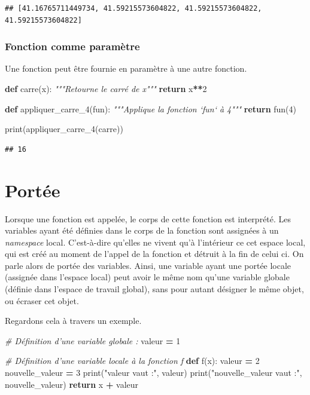 \documentclass[12pt,]{book}
\newenvironment{Shaded}{\begin{snugshade}}{\end{snugshade}}
\newcommand{\KeywordTok}[1]{\textcolor[rgb]{0.13,0.29,0.53}{\textbf{#1}}}
\newcommand{\DecValTok}[1]{\textcolor[rgb]{0.00,0.00,0.81}{#1}}
\newcommand{\StringTok}[1]{\textcolor[rgb]{0.31,0.60,0.02}{#1}}
\newcommand{\CommentTok}[1]{\textcolor[rgb]{0.56,0.35,0.01}{\textit{#1}}}
\newcommand{\ControlFlowTok}[1]{\textcolor[rgb]{0.13,0.29,0.53}{\textbf{#1}}}
\newcommand{\OperatorTok}[1]{\textcolor[rgb]{0.81,0.36,0.00}{\textbf{#1}}}
\newcommand{\BuiltInTok}[1]{#1}
\newcommand{\NormalTok}[1]{#1}
\numberwithin{equation}{section}
\numberwithin{countremarque}{section}
\begin{document}
\begin{lstlisting}
## [41.16765711449734, 41.59215573604822, 41.59215573604822, 41.59215573604822]
\end{lstlisting}

\subsubsection{Fonction comme paramètre}\label{fonction-comme-parametre}

Une fonction peut être fournie en paramètre à une autre fonction.

\begin{Shaded}
\begin{Highlighting}[]
\KeywordTok{def}\NormalTok{ carre(x):}
  \CommentTok{"""Retourne le carré de x"""}
  \ControlFlowTok{return}\NormalTok{ x}\OperatorTok{**}\DecValTok{2}
  
\KeywordTok{def}\NormalTok{ appliquer_carre_4(fun):}
  \CommentTok{"""Applique la fonction `fun` à 4"""}
  \ControlFlowTok{return}\NormalTok{ fun(}\DecValTok{4}\NormalTok{)}

\BuiltInTok{print}\NormalTok{(appliquer_carre_4(carre))}
\end{Highlighting}
\end{Shaded}

\begin{lstlisting}
## 16
\end{lstlisting}

\section{Portée}\label{portee}

Lorsque une fonction est appelée, le corps de cette fonction est
interprété. Les variables ayant été définies dans le corps de la
fonction sont assignées à un \emph{namespace} local. C'est-à-dire
qu'elles ne vivent qu'à l'intérieur ce cet espace local, qui est créé au
moment de l'appel de la fonction et détruit à la fin de celui ci. On
parle alors de portée des variables. Ainsi, une variable ayant une
portée locale (assignée dans l'espace local) peut avoir le même nom
qu'une variable globale (définie dans l'espace de travail global), sans
pour autant désigner le même objet, ou écraser cet objet.

Regardons cela à travers un exemple.

\begin{Shaded}
\begin{Highlighting}[]
\CommentTok{# Définition d'une variable globale :}
\NormalTok{valeur }\OperatorTok{=} \DecValTok{1}

\CommentTok{# Définition d'une variable locale à la fonction f}
\KeywordTok{def}\NormalTok{ f(x):}
\NormalTok{  valeur }\OperatorTok{=} \DecValTok{2}
\NormalTok{  nouvelle_valeur }\OperatorTok{=} \DecValTok{3}
  \BuiltInTok{print}\NormalTok{(}\StringTok{"valeur vaut :"}\NormalTok{, valeur)}
  \BuiltInTok{print}\NormalTok{(}\StringTok{"nouvelle_valeur vaut :"}\NormalTok{, nouvelle_valeur)}
  \ControlFlowTok{return}\NormalTok{ x }\OperatorTok{+}\NormalTok{ valeur}
\end{Highlighting}
\end{Shaded}
\end{document}
